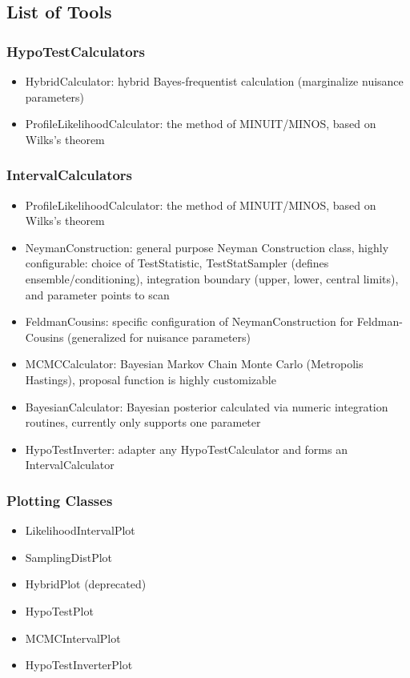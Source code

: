 \documentclass[11pt]{article}
\begin{document}
\subsection{List of Tools}

\subsubsection{HypoTestCalculators}
\begin{itemize}
 \item HybridCalculator: hybrid Bayes-frequentist calculation (marginalize nuisance parameters)
 \item ProfileLikelihoodCalculator: the method of MINUIT/MINOS, based on Wilks's theorem 
\end{itemize}

\subsubsection{IntervalCalculators}
\begin{itemize}
  \item ProfileLikelihoodCalculator: the method of MINUIT/MINOS, based on Wilks's theorem
 \item NeymanConstruction: general purpose Neyman Construction class, highly configurable: choice of TestStatistic, TestStatSampler (defines ensemble/conditioning), integration boundary (upper, lower, central limits), and parameter points to scan
 \item FeldmanCousins: specific configuration of NeymanConstruction for Feldman-Cousins (generalized for nuisance parameters)

 \item MCMCCalculator: Bayesian Markov Chain Monte Carlo (Metropolis Hastings), proposal function is highly customizable

 \item BayesianCalculator: Bayesian posterior calculated via numeric integration routines, currently only supports one parameter 

 \item HypoTestInverter: adapter any HypoTestCalculator and forms an IntervalCalculator
\end{itemize}

\subsubsection{Plotting Classes}
\begin{itemize}
 \item LikelihoodIntervalPlot
 \item SamplingDistPlot
 \item HybridPlot (deprecated)
 \item HypoTestPlot 
 \item MCMCIntervalPlot
 \item HypoTestInverterPlot
\end{itemize}
\end{document}
